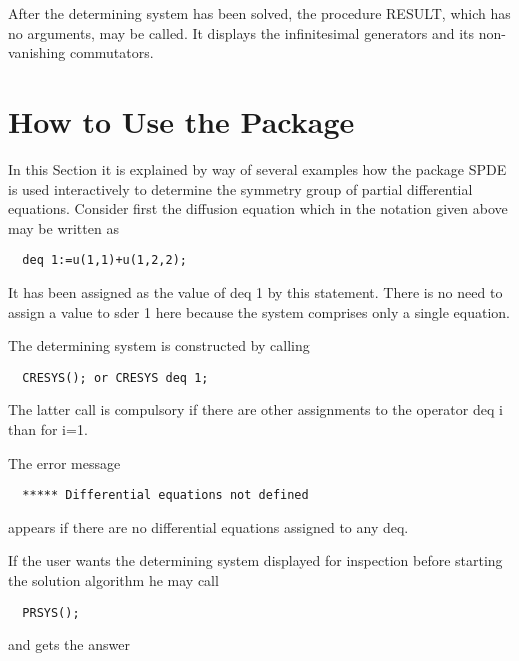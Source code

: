 After the determining system has been solved, the procedure RESULT,
which has no arguments, may be called. It displays the infinitesimal
generators and its non-vanishing commutators.


\section{How to Use the Package}

In this Section it is explained by way of several examples how the
package SPDE is used interactively to determine the symmetry group of
partial differential equations. Consider first the diffusion equation
which in the notation given above may be written as

\begin{verbatim}
  deq 1:=u(1,1)+u(1,2,2);
\end{verbatim}

It has been assigned as the value of deq 1 by this statement.  There
is no need to assign a value to sder 1 here because the system
comprises only a single equation.

The determining system is constructed by calling

\begin{verbatim}
  CRESYS(); or CRESYS deq 1;
\end{verbatim}

The latter call is compulsory if there are other assignments to the
operator deq i than for i=1.

The error message

\begin{verbatim}
  ***** Differential equations not defined
\end{verbatim}

appears if there are no differential equations assigned to any deq.

If the user wants the determining system displayed for inspection
before starting the solution algorithm he may call

\begin{verbatim}
  PRSYS();
\end{verbatim}

and gets the answer

